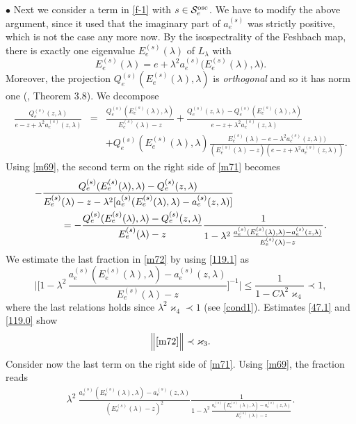 \documentclass[letterpaper,onecolumn,11pt,accepted=2021-12-09]{quantumarticle}
\numberwithin{equation}{section}
\newcommand{\aes}{a_e^{(s)}}
\newcommand{\Qes}{Q_e^{(s)}}
\newcommand{\Ees}{E_e^{(s)}(\lambda)}
\begin{document}
$\bullet$ Next we consider a term in \eqref{f-1} with $s\in{\mathcal S}_e^{\rm osc}$. We have to modify the above argument, since  it used that the imaginary part of $\aes$ was strictly positive, which is not the case any more now. By the isospectrality of the Feshbach map, there is exactly one  eigenvalue $E_e^{(s)}(\lambda)$ of $L_\lambda$ with 
\begin{equation}
E_e^{(s)}(\lambda) = e+\lambda^2\aes\big(E_e^{(s)}(\lambda), \lambda\big).
\label{m69} 
\end{equation}
Moreover, the projection $\Qes(\Ees,\lambda)$ is {\em orthogonal} and so it has norm one (\cite{DJ}, Theorem 3.8). 
We decompose
\begin{eqnarray}
\frac{\Qes(z,\lambda)}{e-z+\lambda^2 \aes(z,\lambda)} &=& \frac{\Qes(E_e^{(s)}(\lambda),\lambda)}{E_e^{(s)}(\lambda)-z}
+\frac{\Qes(z,\lambda) - \Qes(E_e^{(s)}(\lambda),\lambda )}{e-z+\lambda^2\aes(z,\lambda)}\nonumber\\
&&+\Qes(E_e^{(s)}(\lambda),\lambda) \frac{E_e^{(s)}(\lambda)-e-\lambda^2\aes(z,\lambda))}{(E_e^{(s)}(\lambda)-z)(e-z+\lambda^2\aes(z,\lambda))}.
\label{m71}
\end{eqnarray}
Using \eqref{m69}, the second term on the right side of \eqref{m71} becomes
\begin{eqnarray}
	\lefteqn{
-\frac{ \Qes(E_e^{(s)}(\lambda),\lambda)- \Qes(z,\lambda) }{E_e^{(s)}(\lambda)-z-\lambda^2[\aes(E_e^{(s)}(\lambda),\lambda)-  \aes(z,\lambda)]} } \nonumber\\
&& \qquad = -\frac{ \Qes(E_e^{(s)}(\lambda),\lambda) - \Qes(z,\lambda) }{E_e^{(s)}(\lambda)-z} \frac{1}{1-\lambda^2\, \frac{\aes(E_e^{(s)}(\lambda),\lambda)-  \aes(z,\lambda)}{E_e^{(s)}(\lambda)-z}}.
\label{m72}
\end{eqnarray}
We estimate the last fraction in \eqref{m72} by  using \eqref{119.1} as   
\begin{equation}
\Big|\Big[ 1-\lambda^2\, \frac{\aes(E_e^{(s)}(\lambda),\lambda)-  \aes(z,\lambda)}{E_e^{(s)}(\lambda)-z}\Big]^{-1} \Big| \le  \frac{1}{1-C\lambda^2\varkappa_4} \prec 1,
\label{47.1}
\end{equation}
where the last relations holds since $\lambda^2\varkappa_4\prec 1$ (see \eqref{cond1}). Estimates \eqref{47.1} and \eqref{119.0} show
\begin{equation}
\Big\| \eqref{m72}\Big\| \prec \varkappa_3. 
\label{25.1}
\end{equation}
Consider now the last term on the right side of \eqref{m71}. Using \eqref{m69}, the fraction reads
\begin{eqnarray}
\lambda^2 \ \frac{\aes(E_e^{(s)}(\lambda),\lambda)- \aes(z,\lambda)}{(E_e^{(s)}(\lambda)-z)^2} \frac{1}{1-\lambda^2\, \frac{\aes(E_e^{(s)}(\lambda),\lambda) -\aes(z,\lambda)}{E_e^{(s)}(\lambda)-z}}.
\label{m75} 
\end{eqnarray}
\end{document}
